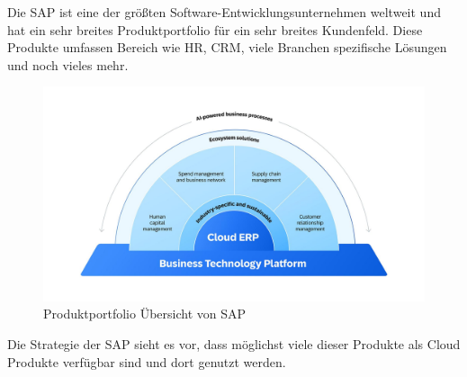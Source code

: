 \documentclass[../main.tex]{subfiles}
\begin{document}
Die SAP ist eine der größten Software-Entwicklungsunternehmen weltweit und hat ein sehr breites Produktportfolio für ein sehr breites Kundenfeld.
Diese Produkte umfassen Bereich wie \gls{HR},  \gls{CRM}, viele Branchen spezifische Lösungen und noch vieles mehr.

\begin{figure}[ht]
    \centering
    \includegraphics[scale=.21]{"bilder/produktportfolio.jpg"}
    \caption{Produktportfolio Übersicht von SAP}
    \label{fig:produktportfolio}
\end{figure}

Die Strategie der SAP sieht es vor, dass möglichst viele dieser Produkte als Cloud Produkte verfügbar sind und dort genutzt werden.
\end{document}
